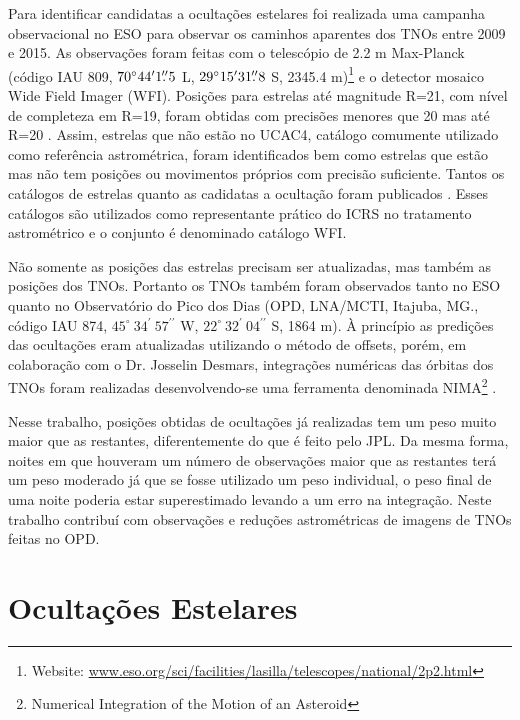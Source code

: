 \documentclass[12pt,a4paper]{monografia}
\newcommand{\degr}{\ensuremath{^{\circ}}}%
\newcommand{\arcmin}{\ensuremath{^{\prime}}}%
\newcommand{\arcsec}{\ensuremath{^{\prime\prime}}}%
\newcommand{\farcs}{\mbox{\ensuremath{.\!\!^{\prime\prime}}}}%
\begin{document}
Para identificar candidatas a ocultações estelares foi realizada uma campanha observacional no ESO para observar os caminhos aparentes dos TNOs entre 2009 e 2015. As observações foram feitas com o telescópio de 2.2 m Max-Planck (código IAU 809, $70\degr44\arcmin1\farcs5$ L, $29\degr15\arcmin31\farcs8$ S, 2345.4 m)\footnote{Website: \url{www.eso.org/sci/facilities/lasilla/telescopes/national/2p2.html}} e o detector mosaico Wide Field Imager (WFI). Posições para estrelas até magnitude R=21, com nível de completeza em R=19, foram obtidas com precisões menores que 20 mas até R=20 \citep{Assafin2012}. Assim, estrelas que não estão no UCAC4, catálogo comumente utilizado como referência astrométrica, foram identificados bem como estrelas que estão mas não tem posições ou movimentos próprios com precisão suficiente. Tantos os catálogos de estrelas quanto as cadidatas a ocultação foram publicados \citep{Assafin2010, Assafin2012, Camargo2013}. Esses catálogos são utilizados como representante prático do ICRS no tratamento astrométrico e o conjunto é denominado catálogo WFI.

Não somente as posições das estrelas precisam ser atualizadas, mas também as posições dos TNOs. Portanto os TNOs também foram observados tanto no ESO quanto no Observatório do Pico dos Dias (OPD, LNA/MCTI, Itajuba, MG., código IAU 874, $45^{\circ} ~34\arcmin ~57\arcsec$ W, $22^{\circ} ~32\arcmin ~04\arcsec$ S, 1864 m). À princípio as predições das ocultações eram atualizadas utilizando o método de offsets, porém, em colaboração com o Dr. Josselin Desmars, integrações numéricas das órbitas dos TNOs foram realizadas desenvolvendo-se uma ferramenta denominada NIMA\footnote{Numerical Integration of the Motion of an Asteroid} \citep[submetido]{Desmars2015}.

Nesse trabalho, posições obtidas de ocultações já realizadas tem um peso muito maior que as restantes, diferentemente do que é feito pelo JPL. Da mesma forma, noites em que houveram um número de observações maior que as restantes terá um peso moderado já que se fosse utilizado um peso individual, o peso final de uma noite poderia estar superestimado levando a um erro na integração. Neste trabalho contribuí com observações e reduções astrométricas de imagens de TNOs feitas no OPD.

\section{Ocultações Estelares}
\label{Sec: TNO-occ}
\end{document}
